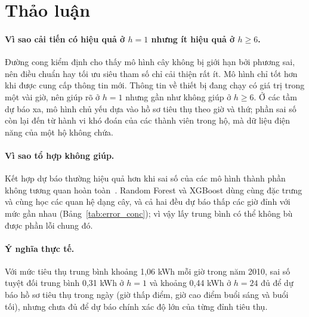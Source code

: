 \section{Thảo luận}
\label{sec:discussion4}

\paragraph{Vì sao cải tiến có hiệu quả ở $h = 1$ nhưng ít hiệu quả ở $h \ge 6$.} Đường cong kiểm định cho thấy mô hình cây không bị giới hạn bởi phương sai, nên điều chuẩn hay tối ưu siêu tham số chỉ cải thiện rất ít. Mô hình chỉ tốt hơn khi được cung cấp thông tin mới. Thông tin về thiết bị đang chạy có giá trị trong một vài giờ, nên giúp rõ ở $h = 1$ nhưng gần như không giúp ở $h \ge 6$. Ở các tầm dự báo xa, mô hình chủ yếu dựa vào hồ sơ tiêu thụ theo giờ và thứ; phần sai số còn lại đến từ hành vi khó đoán của các thành viên trong hộ, mà dữ liệu điện năng của một hộ không chứa.

\paragraph{Vì sao tổ hợp không giúp.} Kết hợp dự báo thường hiệu quả hơn khi sai số của các mô hình thành phần không tương quan hoàn toàn~\cite{wang2023forecast}. Random Forest và XGBoost dùng cùng đặc trưng và cùng học các quan hệ dạng cây, và cả hai đều dự báo thấp các giờ đỉnh với mức gần nhau (Bảng~\ref{tab:error_conc}); vì vậy lấy trung bình có thể không bù được phần lỗi chung đó.

\paragraph{Ý nghĩa thực tế.} Với mức tiêu thụ trung bình khoảng 1,06 kWh mỗi giờ trong năm 2010, sai số tuyệt đối trung bình 0,31 kWh ở $h = 1$ và khoảng 0,44 kWh ở $h = 24$ đủ để dự báo hồ sơ tiêu thụ trong ngày (giờ thấp điểm, giờ cao điểm buổi sáng và buổi tối), nhưng chưa đủ để dự báo chính xác độ lớn của từng đỉnh tiêu thụ.

